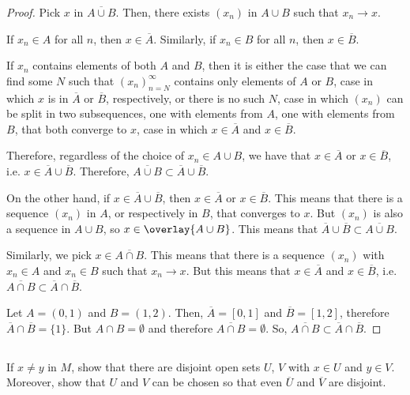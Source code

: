 \begin{proof}
Pick $x$ in $\overline{A \cup B}$. Then, there exists $(x_n)$ in $A \cup B$ such that $x_n \rightarrow x$.

If $x_n \in A$ for all $n$, then $x \in \overline{A}$. Similarly, if $x_n \in B$ for all $n$, then $x \in \overline{B}$.

If $x_n$ contains elements of both $A$ and $B$, then it is either the case that we can find some $N$ such that $(x_n)_{n=N}^\infty$ contains only elements of $A$ or $B$, case in which $x$ is in $\overline{A}$ or $\overline{B}$, respectively, or there is no such $N$, case in which $(x_n)$ can be split in two subsequences, one with elements from $A$, one with elements from $B$, that both converge to $x$, case in which $x\in \overline{A}$ and $x \in \overline{B}$.

Therefore, regardless of the choice of $x_n \in A \cup B$, we have that $x \in \overline{A}$ or $x \in \overline{B}$, i.e. $x \in \overline{A} \cup \overline{B}$. Therefore, $\overline{A \cup B} \subset \overline{A} \cup \overline{B}$.

On the other hand, if $x \in \overline{A} \cup \overline{B}$, then $x \in \overline{A}$ or $x \in \overline{B}$. This means that there is a sequence $(x_n)$ in $A$, or respectively in $B$, that converges to $x$. But $(x_n)$ is also a sequence in $A \cup B$, so $x \in \overlay{A \cup B}$. This means that $\overline{A} \cup \overline{B} \subset \overline{A \cup B}$.

Similarly, we pick $x \in \overline{A \cap B}$. This means that there is a sequence $(x_n)$ with $x_n \in A$ and $x_n \in B$ such that $x_n \rightarrow x$. But this means that $x \in \overline{A}$ and $x \in \overline{B}$, i.e. $\overline{A \cap B} \subset \overline{A} \cap \overline{B}$.

Let $A = (0,1)$ and $B = (1,2)$. Then, $\overline{A} = [0,1]$ and $\overline{B} = [1,2]$, therefore $\overline{A} \cap \overline{B} = \{1\}$. But $A \cap B = \emptyset$ and therefore $\overline{A \cap B} = \emptyset$. So, $\overline{A \cap B} \subset \overline{A} \cap \overline{B}$.

\end{proof}


\subsection{} If $x \neq  y$ in $M$, show that there are disjoint open sets $U$, $V$ with $x \in U$ and $y \in V$. Moreover, show that $U$ and $V$ can be chosen so that even $\overline{U}$ and $\overline{V}$ are disjoint.

